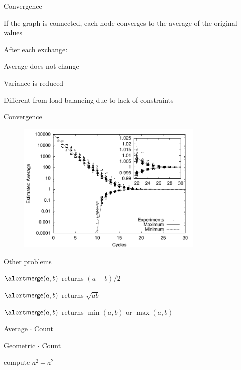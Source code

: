\begin{frame}{Convergence}
	
\BIL
\item If the graph is connected, each node converges to the average of the original values
\item After each exchange:
	\BI
	\item Average does not change
	\item Variance is reduced
	\EI
\item Different from load balancing due to lack of constraints
\EIL

\end{frame}

\begin{frame}{Convergence}
	
\begin{figure}
	\includegraphics[width=0.80\textwidth]{figs/11/average}
\end{figure}	
	
\end{frame}

\begin{frame}{Other problems}

\BIL
\item {}	$\Merge(a,b)$ returns $(a+b)/2$
\item {}	$\Merge(a,b)$ returns $\sqrt{ab}$
\item {}	$\Merge(a,b)$ returns $\min(a,b)$ or $\max(a,b)$
\item {}	Average $\cdot$ \alert{Count}
\item {}	Geometric $\cdot$ \alert{Count}
\item {}	compute $\overline{a^2} - \overline{a}^2$
\EIL

\end{frame}

